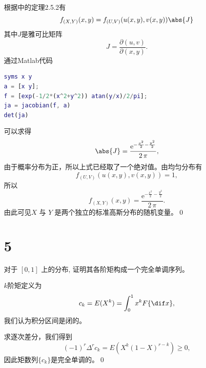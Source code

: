 \documentclass[12pt,a4]{ctexart}
\begin{document}
根据\cite[P91]{THU-stat}中的定理2.5.2有
\begin{equation}
	f_{(X,Y)}(x,y) =f_{(U,V)} (u(x,y),v(x,y)) \abs{J}
\end{equation}
其中$J$是雅可比矩阵
\begin{equation}
	J = \frac{\partial (u,v)}{\partial (x,y)}.
\end{equation}
通过{Matlab}代码
\begin{lstlisting}[language=matlab]
syms x y
a = [x y];
f = [exp(-1/2*(x^2+y^2)) atan(y/x)/2/pi];
ja = jacobian(f, a)
det(ja)
\end{lstlisting}
可以求得
\begin{equation}
	\abs{J} = \frac{{\mathrm{e}}^{-\frac{x^2 }{2}-\frac{y^2 }{2}} }{2\,\pi },
\end{equation}
由于概率分布为正，所以上式已经取了一个绝对值。由均匀分布有
\begin{equation}
	f_{(U,V)} (u(x,y),v(x,y)) = 1,
\end{equation}
所以
\begin{equation}
	f_{(X,Y)}(x,y) = \frac{{\mathrm{e}}^{-\frac{x^2 }{2}-\frac{y^2 }{2}} }{2\,\pi }.
\end{equation}
由此可见$X$ 与 $Y$ 是两个独立的标准高斯分布的随机变量。\qed


\section{5}

对于 $[0,1]$ 上的分布, 证明其各阶矩构成一个完全单调序列。


$k$阶矩定义为\cite[P196]{feller}
\begin{equation}
	c_k = E(X^k) = \int^1_0 x^k F\{\dif x\},
\end{equation}
我们认为积分区间是闭的。

求逐次差分，我们得到
\begin{equation}
	(-1)^r \Delta^r c_k = E(X^k(1-X)^{r-k})\geqslant 0,
\end{equation}
因此矩数列$\{c_k\}$是完全单调的。\qed



\end{document}
